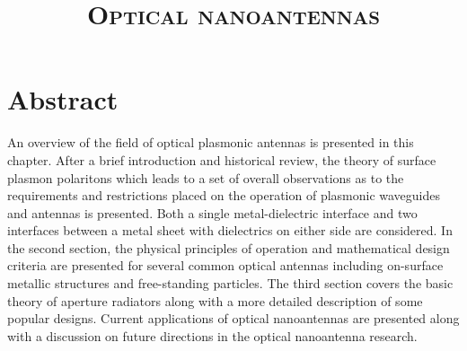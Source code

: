 \documentclass[11pt]{article}
\begin{document}
\title{\textsc{Optical nanoantennas}}

\maketitle

\section{Abstract}
%
An overview of the field of optical plasmonic antennas is presented in this chapter. After a brief introduction and historical review, the theory of surface plasmon polaritons which leads to a set of overall observations as to the requirements and restrictions placed on the operation of plasmonic waveguides and antennas is presented. Both a single metal-dielectric interface and two interfaces between a metal sheet with dielectrics on either side are considered. In the second section, the physical principles of operation and mathematical design criteria are presented for several common optical antennas including on-surface metallic structures and free-standing particles. The third section covers the basic theory of aperture radiators along with a more detailed description of some popular designs. Current applications of optical nanoantennas are presented along with a discussion on future directions in the optical nanoantenna research.
%
\end{document}
